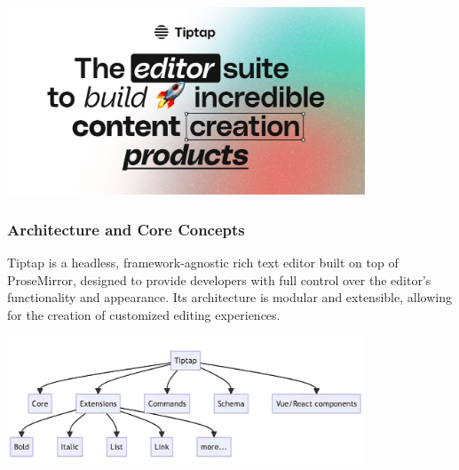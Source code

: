 \begin{center}
    \centering
    \includegraphics[width=0.8\textwidth]{Images/Tiptap editor.jpg}
     \cite{tiptap_editor}
    \label{fig:tiptap_editor}
\end{center}

\subsubsection{Architecture and Core Concepts}
Tiptap is a headless, framework-agnostic rich text editor built on top of ProseMirror, designed to provide developers with full control over the editor’s functionality and appearance. Its architecture is modular and extensible, allowing for the creation of customized editing experiences.

\begin{center}
    \centering
    \includegraphics[width=0.8\textwidth]{Images/Tiptap Architecture.png}
    \label{fig:tiptapArchitecture}
\end{center}

